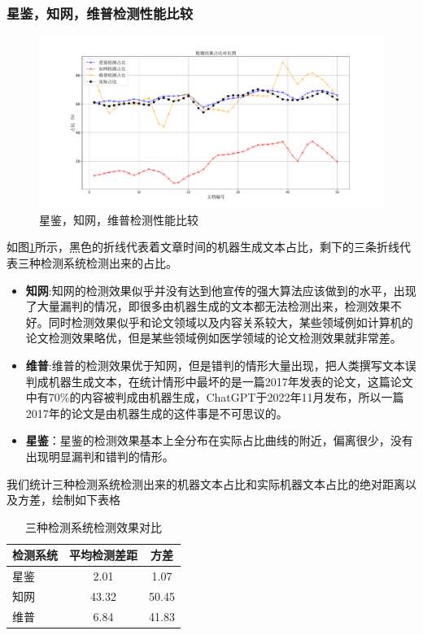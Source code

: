 \documentclass[a4paper]{report}
\begin{document}
\subsubsection{星鉴，知网，维普检测性能比较}
\begin{figure}[H]
	\centering
	\includegraphics[width=\textwidth]{figures/星鉴性能对比图.pdf}
	\caption{星鉴，知网，维普检测性能比较}
	\label{星鉴，知网，维普检测性能比较}
\end{figure}
如图\ref{星鉴，知网，维普检测性能比较}所示，黑色的折线代表着文章时间的机器生成文本占比，剩下的三条折线代表三种检测系统检测出来的占比。
\begin{itemize}
	\item \textbf{知网}:知网的检测效果似乎并没有达到他宣传的强大算法应该做到的水平，出现了大量漏判的情况，即很多由机器生成的文本都无法检测出来，检测效果不好。同时检测效果似乎和论文领域以及内容关系较大，某些领域例如计算机的论文检测效果略优，但是某些领域例如医学领域的论文检测效果就非常差。
	\item \textbf{维普}:维普的检测效果优于知网，但是错判的情形大量出现，把人类撰写文本误判成机器生成文本，在统计情形中最坏的是一篇2017年发表的论文，这篇论文中有70\%的内容被判成由机器生成，ChatGPT于2022年11月发布，所以一篇2017年的论文是由机器生成的这件事是不可思议的。
	\item \textbf{星鉴}：星鉴的检测效果基本上全分布在实际占比曲线的附近，偏离很少，没有出现明显漏判和错判的情形。
\end{itemize}

我们统计三种检测系统检测出来的机器文本占比和实际机器文本占比的绝对距离以及方差，绘制如下表格
\begin{table}[H]
	\centering
	\begin{tabular}{lcc}
		\toprule
		\textbf{检测系统} & \textbf{平均检测差距} & \textbf{方差} \\
		\midrule
		星鉴            & 2.01            & 1.07        \\
		知网            & 43.32           & 50.45       \\
		维普            & 6.84            & 41.83       \\
		\bottomrule
	\end{tabular}
	\caption{三种检测系统检测效果对比}
	\label{tab:检测系统比较}
\end{table}
\end{document}

